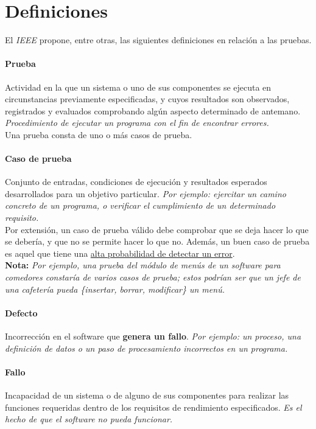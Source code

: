 \section{Definiciones}

El \textit{IEEE} propone, entre otras, las siguientes definiciones en relación a las pruebas.

\paragraph{Prueba} Actividad en la que un sistema o uno de sus componentes se ejecuta en circunstancias previamente especificadas, y cuyos resultados son observados, registrados y evaluados comprobando algún aspecto determinado de antemano. \textit{Procedimiento de ejecutar un programa con el fin de encontrar errores.}\\

Una prueba consta de uno o más casos de prueba.

\paragraph{Caso de prueba} Conjunto de entradas, condiciones de ejecución y resultados esperados desarrollados para un objetivo particular. \textit{Por ejemplo: ejercitar un camino concreto de un programa, o verificar el cumplimiento de un determinado requisito.}\\

Por extensión, un caso de prueba válido debe comprobar que se deja hacer lo que se debería, y que no se permite hacer lo que no. Además, un buen caso de prueba es aquel que tiene una \uline{alta probabilidad de detectar un error}.\\

\textbf{Nota:} \textit{Por ejemplo, una prueba del módulo de menús de un software para comedores constaría de varios casos de prueba; estos podrían ser que un jefe de una cafetería pueda \{insertar, borrar, modificar\} un menú.}

\paragraph{Defecto} Incorrección en el software que \textbf{genera un fallo}. \textit{Por ejemplo: un proceso, una definición de datos o un paso de procesamiento incorrectos en un programa.}

\paragraph{Fallo} Incapacidad de un sistema o de alguno de sus componentes para realizar las funciones requeridas dentro de los requisitos de rendimiento especificados. \textit{Es el hecho de que el software no pueda funcionar.}\\

